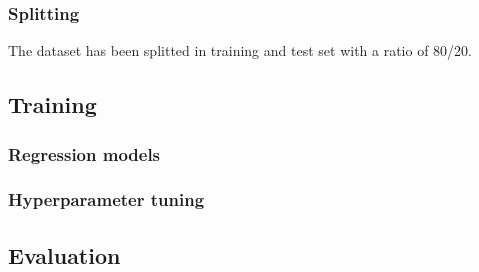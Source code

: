 \subsubsection{Splitting}
\label{sec:preprocessing-splitting}
The dataset has been splitted in training and test set with a ratio of 80/20.

\subsection{Training}
\label{sec:training}

\subsubsection{Regression models}
\label{sec:training-regression-models}

\subsubsection{Hyperparameter tuning}
\label{sec:training-hyperparameter-tuning}

\subsection{Evaluation}
\label{sec:evaluation}
